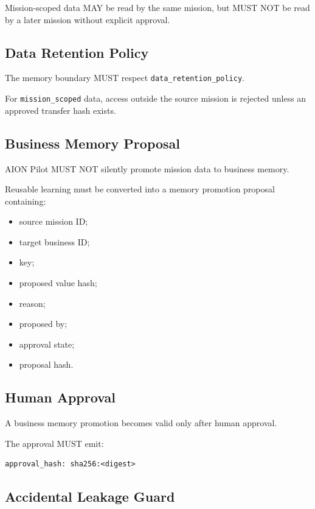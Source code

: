 Mission-scoped data MAY be read by the same mission, but MUST NOT be read by a later mission without explicit approval.

\subsection{Data Retention Policy}

The memory boundary MUST respect \texttt{data\_retention\_policy}.

For \texttt{mission\_scoped} data, access outside the source mission is rejected unless an approved transfer hash exists.

\subsection{Business Memory Proposal}

AION Pilot MUST NOT silently promote mission data to business memory.

Reusable learning must be converted into a memory promotion proposal containing:

\begin{itemize}
  \item source mission ID;
  \item target business ID;
  \item key;
  \item proposed value hash;
  \item reason;
  \item proposed by;
  \item approval state;
  \item proposal hash.
\end{itemize}

\subsection{Human Approval}

A business memory promotion becomes valid only after human approval.

The approval MUST emit:

\begin{verbatim}
approval_hash: sha256:<digest>
\end{verbatim}

\subsection{Accidental Leakage Guard}

